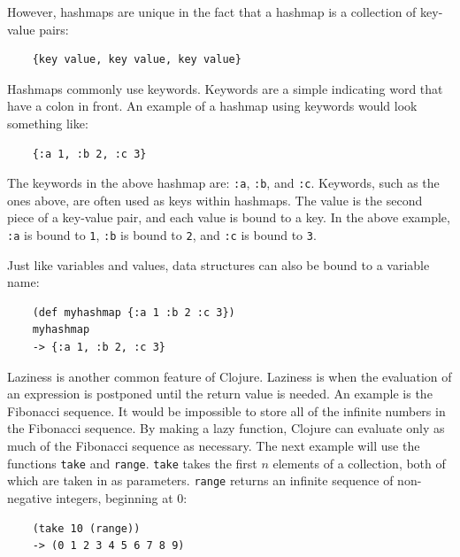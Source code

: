 \documentclass[12pt]{article}
\newcommand{\comment}[1]{{\bf \tt  {#1}}}
\newcommand{\emcomment}[1]{\textcolor{ForestGreen}{\comment{Elena: {#1}}}}
\begin{document}
However, hashmaps are unique in the fact that a hashmap is a collection of key-value pairs: 
\begin{verbatim}
	{key value, key value, key value}
\end{verbatim}

Hashmaps commonly use keywords. Keywords are a simple indicating word that have a colon in front.
An example of a hashmap using keywords would look something like: 
\begin{verbatim}
	{:a 1, :b 2, :c 3}
\end{verbatim}

The keywords in the above hashmap are: \texttt{:a}, \texttt{:b}, and \texttt{:c}. Keywords, such as the
ones above, are often used as keys within hashmaps. The value is the second piece of a key-value pair,
and each value is bound to a key. In the above example, \texttt{:a} is bound to \texttt{1},
\texttt{:b} is bound to \texttt{2}, and \texttt{:c} is bound to \texttt{3}.

Just like variables and values, data structures can also be bound to a
variable name: 
\begin{verbatim}
	(def myhashmap {:a 1 :b 2 :c 3})
	myhashmap
	-> {:a 1, :b 2, :c 3}
\end{verbatim}

Laziness is another common feature of Clojure. Laziness is when the evaluation of an expression is
postponed until the return value is needed. An example is the Fibonacci sequence.
It would be impossible to store all of the infinite numbers in the Fibonacci sequence. By making a lazy
function, Clojure can
evaluate only as much of the Fibonacci sequence as necessary. The next example will use the functions 
\texttt{take} and \texttt{range}. \texttt{take} takes the first $n$ elements of a collection, both of
which are taken in as parameters. \texttt{range} returns an infinite sequence of non-negative
integers, beginning at 0:
\begin{verbatim}
	(take 10 (range))
	-> (0 1 2 3 4 5 6 7 8 9)
\end{verbatim}
\end{document}
